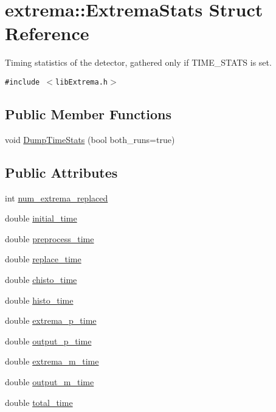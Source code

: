 \hypertarget{structextrema_1_1ExtremaStats}{
\section{extrema::Extrema\-Stats Struct Reference}
\label{structextrema_1_1ExtremaStats}
}
Timing statistics of the detector, gathered only if TIME\_\-STATS is set.  


{\tt \#include $<$lib\-Extrema.h$>$}

\subsection*{Public Member Functions}
\begin{CompactItemize}
\item 
void \hyperlink{structextrema_1_1ExtremaStats_ea026cc226d88cb0a51ebe3ef6799bc5}{Dump\-Time\-Stats} (bool both\_\-runs=true)
\end{CompactItemize}
\subsection*{Public Attributes}
\begin{CompactItemize}
\item 
int \hyperlink{structextrema_1_1ExtremaStats_1c042b8eb434c6a27b70597fb219b152}{num\_\-extrema\_\-replaced}
\item 
double \hyperlink{structextrema_1_1ExtremaStats_0553fd249f328f2cc9b2b53107a713ef}{initial\_\-time}
\item 
double \hyperlink{structextrema_1_1ExtremaStats_f1822762a1b88dcaea090aa4412d1535}{preprocess\_\-time}
\item 
double \hyperlink{structextrema_1_1ExtremaStats_c8d79841d0f5e558175105603da91470}{replace\_\-time}
\item 
double \hyperlink{structextrema_1_1ExtremaStats_4a72f1f5b348ab51bfbd67adef65ea65}{chisto\_\-time}
\item 
double \hyperlink{structextrema_1_1ExtremaStats_2b8b45107a1d0c54c0c21b3e44e40c5f}{histo\_\-time}
\item 
double \hyperlink{structextrema_1_1ExtremaStats_ce9029604b8a175976253293f2c4d54e}{extrema\_\-p\_\-time}
\item 
double \hyperlink{structextrema_1_1ExtremaStats_c0b819222188c8f358fafabde3027fa3}{output\_\-p\_\-time}
\item 
double \hyperlink{structextrema_1_1ExtremaStats_03647c7adf4517547e0bf069a1e3d3fe}{extrema\_\-m\_\-time}
\item 
double \hyperlink{structextrema_1_1ExtremaStats_02052a75ad99ce6fb62582b4fc2e1bc8}{output\_\-m\_\-time}
\item 
double \hyperlink{structextrema_1_1ExtremaStats_7578983cd091758a981c55cf7d868bd7}{total\_\-time}
\end{CompactItemize}


